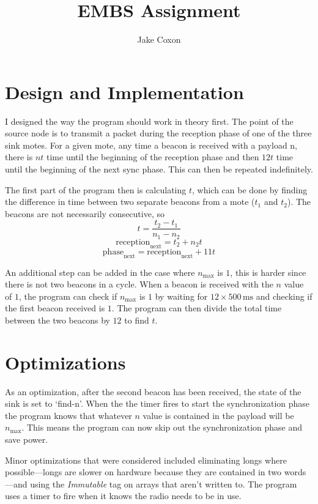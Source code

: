 \documentclass{article}
\newcommand\receptiont[1]{\text{reception}_\text{#1}}
\newcommand\phaset[1]{\text{phase}_\text{#1}}
\newcommand{\ms}{\, \mathrm{ms}}
\newcommand{\nmax}{n_{\text{max}}}
\begin{document}
\title{EMBS Assignment}
\author{Jake Coxon}
\maketitle

\section{Design and Implementation}

I designed the way the program should work in theory first. The point of the source node is to transmit a packet during the reception phase of one of the three sink motes. For a given mote, any time a beacon is received with a payload n, there is $n t$ time until the beginning of the reception phase and then $12 t$ time until the beginning of the next sync phase. This can then be repeated indefinitely.

The first part of the program then is calculating $t$, which can be done by finding the difference in time between two separate beacons from a mote ($t_1$ and $t_2$). The beacons are not necessarily consecutive, so 
\[t = \frac{t_2 - t_1}{n_1 - n_2}\]
\[\receptiont{next} = t_2 + n_2 t\]
\[\phaset{next} = \receptiont{next} + 11 t\]


An additional step can be added in the case where $\nmax$ is $1$, this is harder since there is not two beacons in a cycle. When a beacon is received with the $n$ value of $1$, the program can check if $\nmax$ is $1$ by waiting for $12 \times 500\ms$ and checking if the first beacon received is $1$. The program can then divide the total time between the two beacons by $12$ to find $t$.

\section{Optimizations}

As an optimization, after the second beacon has been received, the state of the sink is set to `find-n'. When the the timer fires to start the synchronization phase the program knows that whatever $n$ value is contained in the payload will be $\nmax$. This means the program can now skip out the synchronization phase and save power.

Minor optimizations that were considered included eliminating longs where possible---longs are slower on hardware because they are contained in two words---and using the \emph{Immutable} tag on arrays that aren't written to. The program uses a timer to fire when it knows the radio needs to be in use.
\end{document}
